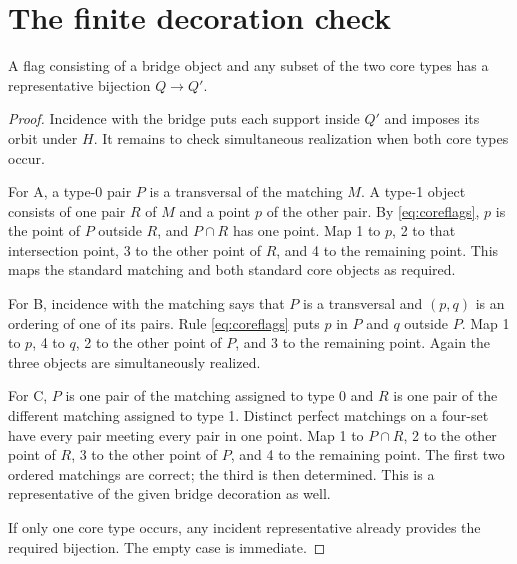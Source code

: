 \section{The finite decoration check}
\begin{lemma}\label{lem:decoration}
A flag consisting of a bridge object and any subset of the two core
types has a representative bijection $Q\longrightarrow Q'$.
\end{lemma}
\begin{proof}
Incidence with the bridge puts each support inside $Q'$ and imposes
its orbit under $H$. It remains to check simultaneous realization when
both core types occur.

For A, a type-0 pair $P$ is a transversal of the matching $M$.
A type-1 object consists of one pair $R$ of $M$ and a point $p$ of the
other pair. By \eqref{eq:coreflags}, $p$ is the point of $P$ outside $R$, and $P\cap R$
has one point. Map 1 to $p$, 2 to that intersection point, 3 to the
other point of $R$, and 4 to the remaining point. This maps the
standard matching and both standard core objects as required.

For B, incidence with the matching says that $P$ is a transversal and
$(p,q)$ is an ordering of one of its pairs. Rule \eqref{eq:coreflags} puts $p$ in $P$
and $q$ outside $P$. Map 1 to $p$, 4 to $q$, 2 to the other point
of $P$, and 3 to the remaining point. Again the three objects are
simultaneously realized.

For C, $P$ is one pair of the matching assigned to type 0 and $R$ is
one pair of the different matching assigned to type 1. Distinct
perfect matchings on a four-set have every pair meeting every pair
in one point. Map 1 to $P\cap R$, 2 to the other point of $R$,
3 to the other point of $P$, and 4 to the remaining point. The first
two ordered matchings are correct; the third is then determined.
This is a representative of the given bridge decoration as well.

If only one core type occurs, any incident representative already
provides the required bijection. The empty case is immediate.
\end{proof}

